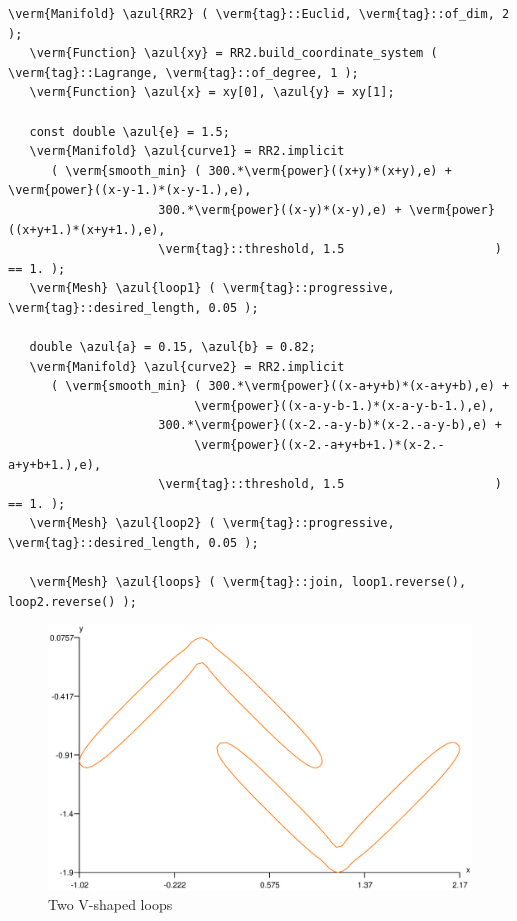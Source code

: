 \begin{Verbatim}[commandchars=\\\{\},formatcom=\small\tt,frame=single,
   label=code not working,rulecolor=\color{coment},
   baselinestretch=0.94,framesep=2mm                                   ]
   \verm{Manifold} \azul{RR2} ( \verm{tag}::Euclid, \verm{tag}::of_dim, 2 );
   \verm{Function} \azul{xy} = RR2.build_coordinate_system ( \verm{tag}::Lagrange, \verm{tag}::of_degree, 1 );
   \verm{Function} \azul{x} = xy[0], \azul{y} = xy[1];
   
   const double \azul{e} = 1.5;
   \verm{Manifold} \azul{curve1} = RR2.implicit 
      ( \verm{smooth_min} ( 300.*\verm{power}((x+y)*(x+y),e) + \verm{power}((x-y-1.)*(x-y-1.),e),
                     300.*\verm{power}((x-y)*(x-y),e) + \verm{power}((x+y+1.)*(x+y+1.),e),
                     \verm{tag}::threshold, 1.5                     )  == 1. );
   \verm{Mesh} \azul{loop1} ( \verm{tag}::progressive, \verm{tag}::desired_length, 0.05 );
      
   double \azul{a} = 0.15, \azul{b} = 0.82;
   \verm{Manifold} \azul{curve2} = RR2.implicit 
      ( \verm{smooth_min} ( 300.*\verm{power}((x-a+y+b)*(x-a+y+b),e) +
                          \verm{power}((x-a-y-b-1.)*(x-a-y-b-1.),e),
                     300.*\verm{power}((x-2.-a-y-b)*(x-2.-a-y-b),e) +
                          \verm{power}((x-2.-a+y+b+1.)*(x-2.-a+y+b+1.),e),
                     \verm{tag}::threshold, 1.5                     )  == 1. );
   \verm{Mesh} \azul{loop2} ( \verm{tag}::progressive, \verm{tag}::desired_length, 0.05 );

   \verm{Mesh} \azul{loops} ( \verm{tag}::join, loop1.reverse(), loop2.reverse() );                     
\end{Verbatim}

\begin{figure}[ht] \centering
  \includegraphics[width=130mm]{boomerang-1.eps}
  \caption{Two V-shaped loops}
  \label{\numb section 7.\numb fig 12}
\end{figure}

